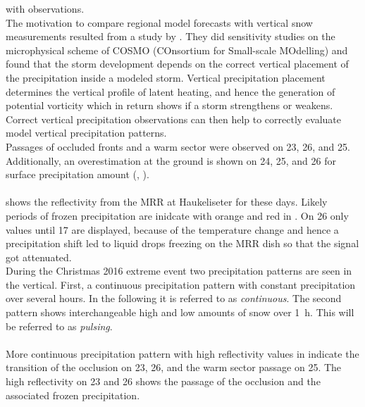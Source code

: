 with observations.
\\
The motivation to compare regional model forecasts with vertical snow measurements resulted from a study by \citet{joos_influence_2012}. They did sensitivity studies on the microphysical scheme of COSMO (COnsortium for Small-scale MOdelling) and found that the storm development depends on the correct vertical placement of the precipitation inside a modeled storm. Vertical precipitation placement determines the vertical profile of latent heating, and hence the generation of potential vorticity which in return shows if a storm strengthens or weakens. Correct vertical precipitation observations can then help to correctly evaluate model vertical precipitation patterns.
\\
Passages of occluded fronts and a warm sector were observed on \num{23}, \num{26}, and \SI{25}{\dec}. Additionally, an overestimation at the ground is shown on  \num{24}, \num{25}, and \SI{26}{\dec} for surface precipitation amount (, ). 
\\
\\
 shows the reflectivity from the MRR at Haukeliseter for these days. Likely periods of frozen precipitation are inidcate with orange and red in .%
On \SI{26}{\dec} only values until \SI{17}{\UTC} are displayed, because of the temperature change and hence a precipitation shift led to liquid drops freezing on the MRR dish so that the signal got attenuated.
\\
During the Christmas 2016 extreme event two precipitation patterns are seen in the vertical. First, a continuous precipitation pattern with constant precipitation over several hours. In the following it is referred to as \textit{continuous}.
The second pattern shows interchangeable high and low amounts of snow over \SI{1}{\hour}. This will be referred to as \textit{pulsing}.
\\
\\
More continuous precipitation pattern with high reflectivity values in  indicate the transition of the occlusion on \num{23}, \num{26}, and the warm sector passage on \SI{25}{\dec}.
The high reflectivity on \num{23} and \SI{26}{\dec} shows the passage of the occlusion and the associated frozen precipitation.
